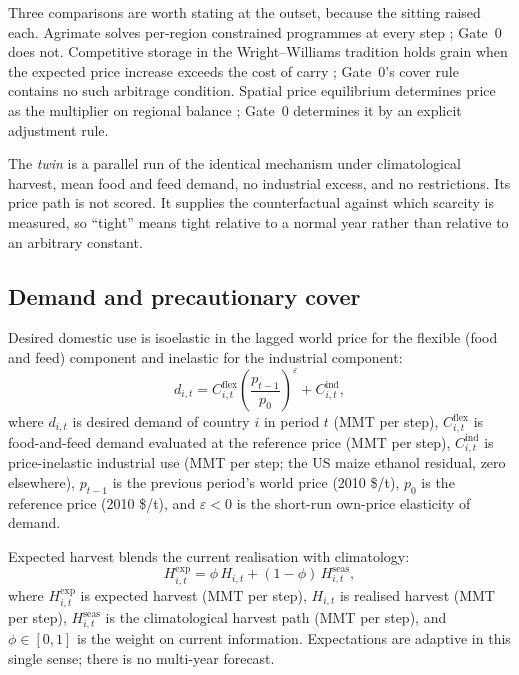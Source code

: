Three comparisons are worth stating at the outset, because the sitting
raised each. Agrimate solves per-region constrained programmes at every
step \citep{kuhla2025}; Gate~0 does not. Competitive storage in the
Wright--Williams tradition holds grain when the expected price increase
exceeds the cost of carry \citep{wright1982,williams1991}; Gate~0's cover
rule contains no such arbitrage condition. Spatial price equilibrium
determines price as the multiplier on regional balance
\citep{samuelson1952,takayama1971}; Gate~0 determines it by an explicit
adjustment rule.

The \emph{twin} is a parallel run of the identical mechanism under
climatological harvest, mean food and feed demand, no industrial excess,
and no restrictions. Its price path is not scored. It supplies the
counterfactual against which scarcity is measured, so ``tight'' means
tight relative to a normal year rather than relative to an arbitrary
constant.


\subsection{Demand and precautionary cover}

Desired domestic use is isoelastic in the lagged world price for the
flexible (food and feed) component and inelastic for the industrial
component:
\begin{equation}
d_{i,t}=C^{\mathrm{flex}}_{i,t}\left(\frac{p_{t-1}}{p_0}\right)^{\varepsilon}
+C^{\mathrm{ind}}_{i,t},
\label{eq:demand}
\end{equation}
where \(d_{i,t}\) is desired demand of country \(i\) in period \(t\)
(MMT per step), \(C^{\mathrm{flex}}_{i,t}\) is food-and-feed demand
evaluated at the reference price (MMT per step), \(C^{\mathrm{ind}}_{i,t}\)
is price-inelastic industrial use (MMT per step; the US maize ethanol
residual, zero elsewhere), \(p_{t-1}\) is the previous period's world
price (2010 \$/t), \(p_0\) is the reference price (2010 \$/t), and
\(\varepsilon<0\) is the short-run own-price elasticity of demand.

Expected harvest blends the current realisation with climatology:
\begin{equation}
H^{\mathrm{exp}}_{i,t}=\phi\,H_{i,t}+(1-\phi)\,H^{\mathrm{seas}}_{i,t},
\label{eq:hexp}
\end{equation}
where \(H^{\mathrm{exp}}_{i,t}\) is expected harvest (MMT per step),
\(H_{i,t}\) is realised harvest (MMT per step), \(H^{\mathrm{seas}}_{i,t}\)
is the climatological harvest path (MMT per step), and
\(\phi\in[0,1]\) is the weight on current information. Expectations are
adaptive in this single sense; there is no multi-year forecast.

